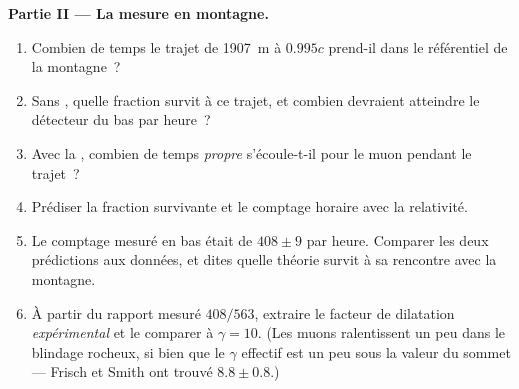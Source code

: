 \begin{problem}
\medskip\noindent\textbf{Partie II --- La mesure en montagne.}
\begin{enumerate}[resume]
  \item Combien de temps le trajet de \qty{1907}{m} à $0.995c$
        prend-il dans le référentiel de la montagne~?
  \item Sans , quelle fraction survit à ce trajet,
        et combien devraient atteindre le détecteur du bas par heure~?
  \item Avec la , combien de temps \emph{propre}
        s'écoule-t-il pour le muon pendant le trajet~?
  \item Prédiser la fraction survivante et le comptage horaire avec la
        relativité.
  \item Le comptage mesuré en bas était de $408 \pm 9$ par heure.
        Comparer les deux prédictions aux données, et dites quelle
        théorie survit à sa rencontre avec la montagne.
  \item À partir du rapport mesuré $408/563$, extraire le facteur de
        dilatation \emph{expérimental} et le comparer à
        $\gamma = 10$. (Les muons ralentissent un peu dans le blindage
        rocheux, si bien que le $\gamma$ effectif est un peu sous la
        valeur du sommet --- Frisch et Smith ont trouvé $8.8 \pm
        0.8$.)
\end{enumerate}


\end{problem}
